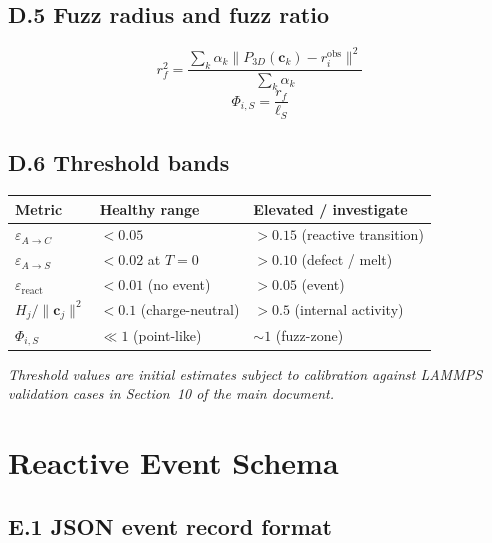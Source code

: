 \documentclass[11pt, a4paper, oneside]{article}
\newcommand{\ObsLoc}{r_i^{\mathrm{obs}}}
\newcommand{\FuzzR}{r_f}
\newcommand{\ScaleL}{\ell_S}
\newcommand{\FuzzRatio}{\Phi_{i,S}}
\begin{document}
\begin{appendices}
\subsection*{D.5 Fuzz radius and fuzz ratio}

\begin{equation}
  \FuzzR^2
  = \frac{\sum_k \alpha_k
		  \bigl\|P_{3D}(\mathbf{c}_k) - \ObsLoc\bigr\|^2}
		 {\sum_k \alpha_k}
  \tag{D.9}
\end{equation}
\begin{equation}
  \FuzzRatio = \frac{\FuzzR}{\ScaleL}
  \tag{D.10}
\end{equation}

\subsection*{D.6 Threshold bands}

\begin{center}
\begin{tabular}{lll}
  \toprule
  Metric & Healthy range & Elevated / investigate \\
  \midrule
  $\varepsilon_{A \to C}$ & $< 0.05$ & $> 0.15$ (reactive transition) \\
  $\varepsilon_{A \to S}$ & $< 0.02$ at $T=0$ & $> 0.10$ (defect / melt) \\
  $\varepsilon_{\mathrm{react}}$ & $< 0.01$ (no event) & $> 0.05$ (event) \\
  $H_j / \|\mathbf{c}_j\|^2$ & $< 0.1$ (charge-neutral) & $> 0.5$ (internal activity) \\
  $\FuzzRatio$ & $\ll 1$ (point-like) & $\sim 1$ (fuzz-zone) \\
  \bottomrule
\end{tabular}
\end{center}

\textit{Threshold values are initial estimates subject to calibration
against LAMMPS validation cases in Section~10 of the main document.}

\section{Reactive Event Schema}
\label{app:E}

\subsection*{E.1 JSON event record format}


\end{appendices}
\end{document}
